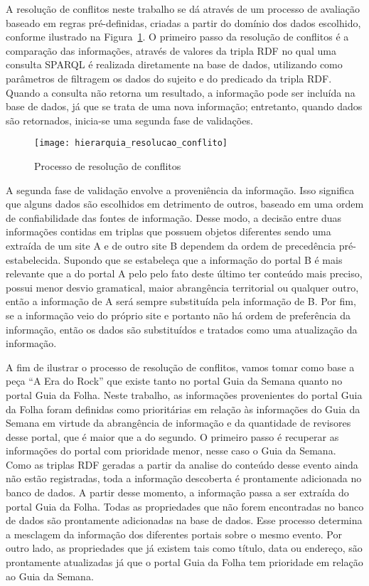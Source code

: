 A resolução de conflitos neste trabalho se dá através de um processo de avaliação baseado em regras pré-definidas, criadas a partir do domínio dos dados escolhido, conforme ilustrado na Figura~\ref{fig:hierarquia_resolucao_conflito}. O primeiro passo da resolução de conflitos é a comparação das informações, através de valores da tripla RDF no qual uma consulta SPARQL é realizada diretamente na base de dados, utilizando como parâmetros de filtragem os dados do sujeito e do predicado da tripla RDF. Quando a consulta não retorna um resultado,  a informação pode ser incluída na base de dados, já que se trata de uma nova informação; entretanto, quando dados são retornados, inicia-se uma segunda fase de validações.

\begin{figure}[!ht]
  \centering
  \texttt{[image: hierarquia\_resolucao\_conflito]} 
  \caption{Processo de resolução de conflitos}
  \label{fig:hierarquia_resolucao_conflito} 
\end{figure}

A segunda fase de validação envolve a proveniência da informação. Isso significa que alguns dados são escolhidos em detrimento de outros, baseado em uma ordem de confiabilidade das fontes de informação. Desse modo, a decisão entre duas informações contidas em triplas que possuem objetos diferentes sendo uma extraída de um site A e de outro site B dependem da ordem de precedência pré-estabelecida. Supondo que se estabeleça que a informação do portal B é mais relevante que a do portal A pelo pelo fato deste último ter conteúdo mais preciso, possui menor desvio gramatical, maior abrangência territorial ou qualquer outro, então a informação de A será sempre substituída pela informação de B. Por fim, se a informação veio do próprio site e portanto não há ordem de preferência da informação, então os dados são substituídos e tratados como uma atualização da informação.

A fim de ilustrar o processo de resolução de conflitos, vamos tomar como base a peça ``A Era do Rock'' que existe tanto no portal Guia da Semana quanto no portal Guia da Folha. Neste trabalho, as informações provenientes do portal Guia da Folha foram definidas como prioritárias em relação às informações do Guia da Semana em virtude da abrangência de informação e da quantidade de revisores desse portal, que é maior que a do segundo. O primeiro passo é recuperar as informações do portal com prioridade menor, nesse caso o Guia da Semana. Como as triplas RDF geradas a partir da analise do conteúdo desse evento ainda não estão registradas, toda a informação descoberta é prontamente adicionada no banco de dados. A partir desse momento, a informação passa a ser extraída do portal Guia da Folha. Todas as propriedades que não forem encontradas no banco de dados são prontamente adicionadas na base de dados. Esse processo determina a mesclagem da informação dos diferentes portais sobre o mesmo evento. Por outro lado, as propriedades que já existem tais como título, data ou endereço, são prontamente atualizadas já que o portal Guia da Folha tem prioridade em relação ao Guia da Semana. 

